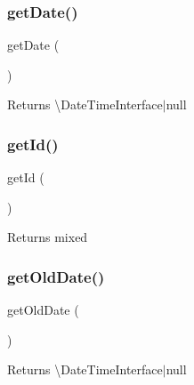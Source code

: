 \subsubsection{\texorpdfstring{getDate()}{getDate()}}
{\footnotesize\ttfamily get\+Date (\begin{DoxyParamCaption}{ }\end{DoxyParamCaption})}

\begin{DoxyReturn}{Returns}
\textbackslash{}\+Date\+Time\+Interface$\vert$null 
\end{DoxyReturn}
\mbox{\label{class_app_1_1_entity_1_1_proposition_a12251d0c022e9e21c137a105ff683f13}} 
\subsubsection{\texorpdfstring{getId()}{getId()}}
{\footnotesize\ttfamily get\+Id (\begin{DoxyParamCaption}{ }\end{DoxyParamCaption})}

\begin{DoxyReturn}{Returns}
mixed 
\end{DoxyReturn}
\mbox{\label{class_app_1_1_entity_1_1_proposition_ac7965e177345d55c4a73d4fc25014209}} 
\subsubsection{\texorpdfstring{getOldDate()}{getOldDate()}}
{\footnotesize\ttfamily get\+Old\+Date (\begin{DoxyParamCaption}{ }\end{DoxyParamCaption})}

\begin{DoxyReturn}{Returns}
\textbackslash{}\+Date\+Time\+Interface$\vert$null 
\end{DoxyReturn}
\mbox{\label{class_app_1_1_entity_1_1_proposition_a2fe34e9231846bb458e5bcd806f85d71}} 
